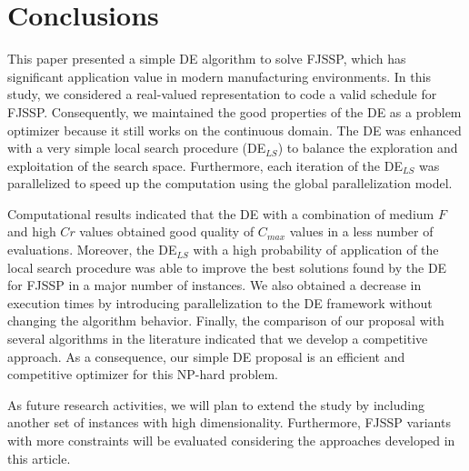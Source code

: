 \documentclass[a4paper]{jcst}
\begin{document}










\section{Conclusions} \label{sec:conclu}

This paper presented a simple DE algorithm to solve FJSSP, which has significant application value in modern manufacturing environments. In this study, we considered a real-valued representation to code a valid schedule for FJSSP. Consequently, we maintained the good properties of the DE as a problem optimizer because it still works on the continuous domain. The DE was enhanced with a very simple local search procedure (DE$_{LS}$) to balance the exploration and exploitation of the search space. Furthermore, each iteration of the DE$_{LS}$ was parallelized to speed up the computation using the global parallelization model. 

Computational results indicated that the DE with a combination of medium $F$ and high $Cr$ values obtained good quality of $C_{max}$ values in a less number of evaluations. Moreover, the DE$_{LS}$ with a high probability of application of the local search procedure was able to improve the best solutions found by the DE for FJSSP in a major number of instances. We also obtained a decrease in execution times by introducing parallelization to the DE framework without changing the algorithm behavior. Finally, the comparison of our proposal with several algorithms in the literature indicated that we develop a competitive approach. As a consequence, our simple DE proposal is an efficient and competitive optimizer for this NP-hard problem.

As future research activities, we will plan to extend the study by including another set of instances with high dimensionality. Furthermore, FJSSP variants with more constraints will be evaluated considering the approaches developed in this article.
\end{document}

